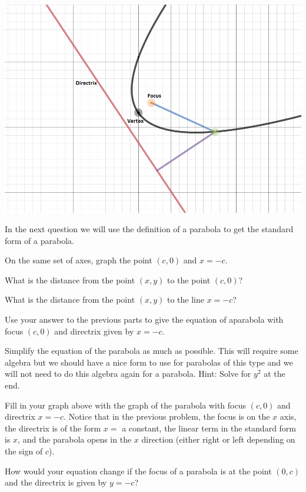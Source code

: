 \begin{center}\includegraphics[scale=.45]{generalparabola2.png} \end{center}

In the next question we will use the definition of a parabola to get the standard form of a parabola.
\bq\label{q22} \be
\item On the same set of axes, graph the point $(c,0)$ and $x=-c$.
\item What is the distance from the point $(x,y)$ to the point $(c,0)$?
\item What is the distance from the point $(x,y)$ to the line $x=-c$?
\item Use your answer to the previous parts to give the equation of a\break parabola with focus $(c,0)$ and directrix given by $x= -c$.
\item Simplify the equation of the parabola as much as possible. This will require some algebra but we should have a nice form to use for parabolas of this type and we will not need to do this algebra again for a parabola. Hint: Solve for $y^2$ at the end.
\item Fill in your graph above with the graph of the parabola with focus $(c,0)$ and directrix $x= -c$.
\ee \eq
Notice that in the previous problem, the focus is on the $x$ axis, the directrix is of the form $x=$ a constant, the linear term in the standard form is $x$, and the parabola opens in the $x$ direction (either right or left depending on the sign of $c$).

\question\label{q23} How would your equation change if the focus of a parabola is at the point $(0,c)$ and the directrix is given by $y=-c$?

